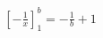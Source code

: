 \documentclass[preview]{standalone}
\begin{document}
\begin{align*}
\left[ -\frac{1}{x} \right]_1^b = -\frac{1}{b} + 1
\end{align*}
\end{document}
